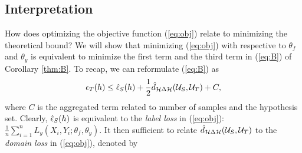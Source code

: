 \subsection{Interpretation}
How does optimizing the objective function (\ref{eq:obj}) relate to minimizing the theoretical bound? We will show that minimizing (\ref{eq:obj}) with respective to $\theta_f$ and $\theta_y$ is equivalent to minimize the first term and the third term in (\ref{eq:B}) of Corollary \ref{thm:B}. To recap, we can reformulate (\ref{eq:B}) as
\begin{equation}
  \epsilon_{T}(h) \leq \hat{\epsilon}_{S}(h) + \frac{1}{2} \hat{d}_{\mathcal{H} \Delta \mathcal{H}}(\mathcal{U}_S, \mathcal{U}_T) + C,
\end{equation}
where $C$ is the aggregated term related to number of samples and the hypothesis set. Clearly, $\hat{\epsilon}_{S}(h)$ is equivalent to the \textit{label loss} in (\ref{eq:obj}): $\frac{1}{n} \sum_{i=1}^{n} L_y(X_i, Y_i; \theta_f, \theta_y)$. It then sufficient to relate $\hat{d}_{\mathcal{H} \Delta \mathcal{H}}(\mathcal{U}_S, \mathcal{U}_T)$ to the \textit{domain loss} in (\ref{eq:obj}), denoted by

